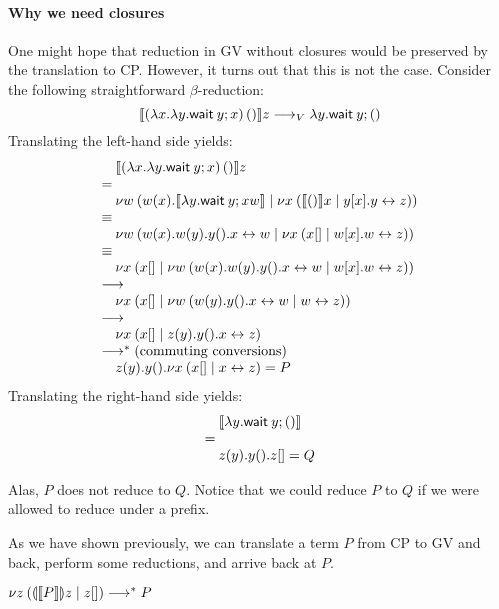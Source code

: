 \documentclass[orivec,envcountsame]{llncs}
\begin{document}
\paragraph{Why we need closures}

One might hope that reduction in GV without closures would be preserved by the translation to
CP. However, it turns out that this is not the case. Consider the following straightforward
$\beta$-reduction:
\[
  \llbracket (\lambda x.\lambda y.\mathsf{wait}\:y; x) \, () \rrbracket z \longrightarrow_V \lambda y.\mathsf{wait}\:y; ()
\]
Translating the left-hand side yields:
\[
\bl
\quad \tocp{(\lambda x.\lambda y.\gvwait{y}; x) \app ()}z \\
= \\
\quad \cut{w}{}{w(x).\tocp{\lambda y.\gvwait{y; x}w}}{\cut{x}{}{\tocp{()}x}{y[x].\link{y}{z}}} \\
\equiv \\
\quad \cut{w}{}{w(x).w(y).y().\link{x}{w}}{\cut{x}{}{x[]}{w[x].\link{w}{z}}} \\
\equiv \\
\quad \cut{x}{}{x[]}{\cut{w}{}{w(x).w(y).y().\link{x}{w}}{w[x].\link{w}{z}}} \\
\rto \\
\quad \cut{x}{}{x[]}{\cut{w}{}{w(y).y().\link{x}{w}}{\link{w}{z}}} \\
\rto \\
\quad \cut{x}{}{x[]}{z(y).y().\link{x}{z}} \\
\rto^* (\text{commuting conversions}) \\
\quad z(y).y().\cut{x}{}{x[]}{\link{x}{z}} = P \\
\el
\]
Translating the right-hand side yields:
\[
\bl
\quad \tocp{\lambda y.\gvwait{y}; ()} \\
= \\
\quad z(y).y().z[] = Q
\el
\]

Alas, $P$ does not reduce to $Q$.
%
Notice that we could reduce $P$ to $Q$ if we were allowed to reduce under a prefix.

As we have shown previously, we can translate a term $P$ from CP to GV and back, perform some
reductions, and arrive back at $P$.
\begin{theorem}
$\nu z \: (\llparenthesis \llbracket P \rrbracket \rrparenthesis z \mid z[]) \longrightarrow^* P$
\end{theorem}

\end{document}
